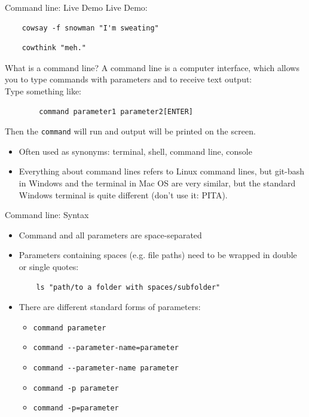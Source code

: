\begin{frame}[fragile]{Command line: Live Demo}
    Live Demo:
    \begin{verbatim}
    cowsay -f snowman "I'm sweating"
    \end{verbatim}
    \begin{verbatim}
    cowthink "meh."
    \end{verbatim}
\end{frame}

\begin{frame}[fragile]{What is a command line?}
    A command line is a computer interface, which allows you to type commands with parameters
    and to receive text output:\\

    Type something like:
    \begin{verbatim}
        command parameter1 parameter2[ENTER]\end{verbatim}
    Then the \verb|command| will run and output will be printed on the screen.
    \bigskip
    \pause
    \begin{itemize}
        \item Often used as synonyms: terminal, shell, command line, console
        \item Everything about command lines refers to Linux command lines, but git-bash in Windows
            and the terminal in Mac OS are very similar, but the standard Windows terminal is quite different
            (don't use it: PITA).
    \end{itemize}
\end{frame}

\begin{frame}[fragile]{Command line: Syntax}

    \begin{itemize}
        \item Command and all parameters are space-separated
        \item Parameters containing spaces (e.g. file paths) need to be wrapped in double or single
            quotes:
            \begin{verbatim}
    ls "path/to a folder with spaces/subfolder"\end{verbatim}
        \item There are different standard forms of parameters:
        \begin{itemize}
            \item \verb|command parameter|
            \item \verb|command --parameter-name=parameter|
            \item \verb|command --parameter-name parameter|
            \item \verb|command -p parameter|
            \item \verb|command -p=parameter|
        \end{itemize}
    \end{itemize}


\end{frame}


